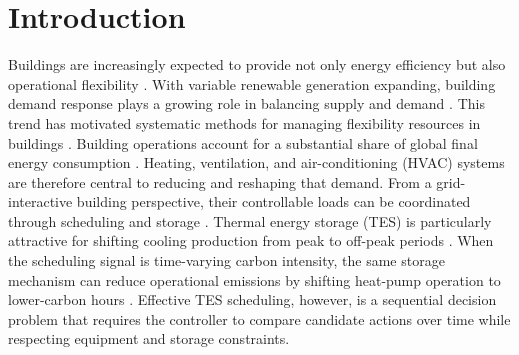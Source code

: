 \documentclass[11pt]{article}
\begin{document}
\section{Introduction}\label{sec:introduction}
Buildings are increasingly expected to provide not only energy efficiency but also operational flexibility \cite{ref:ipcc_ar6_wg3}. With variable renewable generation expanding, building demand response plays a growing role in balancing supply and demand \cite{ref:jurjevic2023_dr_buildings}. This trend has motivated systematic methods for managing flexibility resources in buildings \cite{ref:pedram2023_flex_energies}. Building operations account for a substantial share of global final energy consumption \cite{ref:iea_buildings_energy_system}. Heating, ventilation, and air-conditioning (HVAC) systems are therefore central to reducing and reshaping that demand. From a grid-interactive building perspective, their controllable loads can be coordinated through scheduling and storage \cite{ref:bayasgalan2024_gieb_energies}. Thermal energy storage (TES) is particularly attractive for shifting cooling production from peak to off-peak periods \cite{sun2013_ctes_review}. When the scheduling signal is time-varying carbon intensity, the same storage mechanism can reduce operational emissions by shifting heat-pump operation to lower-carbon hours \cite{miyata2020_dynamic_co2_mpc}. Effective TES scheduling, however, is a sequential decision problem that requires the controller to compare candidate actions over time while respecting equipment and storage constraints.
\end{document}
